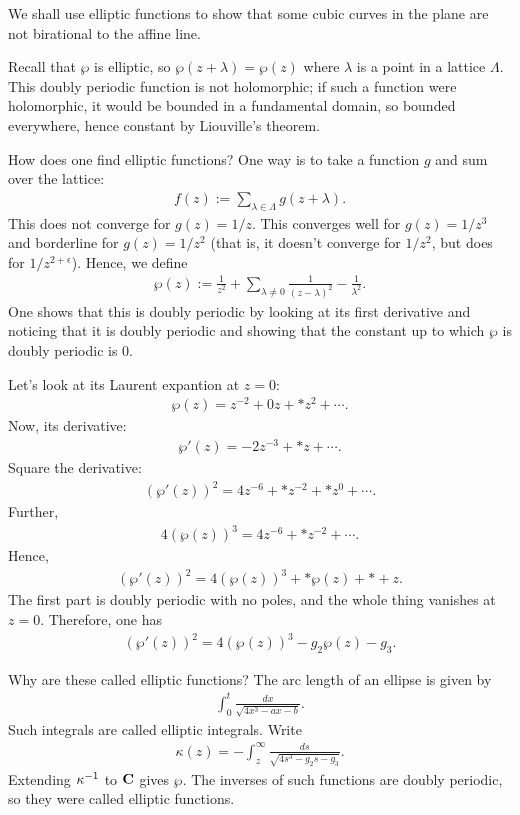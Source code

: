 \documentclass[11pt, oneside,margin=1in]{article}
\begin{document}
We shall use elliptic functions to show that some cubic curves in the plane are not birational to the affine line.

Recall that $\wp$ is elliptic, so $\wp(z+\lambda) = \wp(z)$ where $\lambda$ is a point in a lattice $\Lambda$. This doubly periodic function is not holomorphic; if such a function were holomorphic, it would be bounded in a fundamental domain, so bounded everywhere, hence constant by Liouville's theorem. 

How does one find elliptic functions? One way is to take a function $g$ and sum over the lattice:
\begin{align*}
	f(z) :=  \sum_{\lambda\in \Lambda}^{} g (z+\lambda).
\end{align*}
This does not converge for $g(z) = 1/z$. This converges well for $g(z) = 1/z^3$ and borderline for $g(z)=1/z^2$ (that is, it doesn't converge for $1/z^2$, but does for $1/z^{2+\epsilon}$). Hence, we define
 \begin{align*}
	\wp(z) :=  \frac{1}{z^2} + \sum_{\lambda\ne 0}^{} \frac{1}{(z-\lambda)^2} - \frac{1}{\lambda^2}.
\end{align*}
One shows that this is doubly periodic by looking at its first derivative and noticing that it is doubly periodic and showing that the constant up to which $\wp$ is doubly periodic is $0$.

Let's look at its Laurent expantion at $z=0$:
\begin{align*}
	\wp(z) = z^{-2} + 0 z + *z^2 + \cdots.
\end{align*}
Now, its derivative:
\begin{align*}
	\wp'(z) = -2z^{-3} + *z +\cdots.
\end{align*}
Square the derivative:
\begin{align*}
	(\wp'(z)) ^2 = 4z^{-6} + *z^{-2} + *z^0 + \cdots.
\end{align*}
Further,
\begin{align*}
	4(\wp(z)) ^3 = 4z^{-6} + *z^{-2} + \cdots.
\end{align*}
Hence,
\begin{align*}
	(\wp'(z)) ^2 = 4(\wp(z)) ^3 +  *\wp(z) + * + z.
\end{align*}
The first part is doubly periodic with no poles, and the whole thing vanishes at $z=0$. Therefore, one has
\begin{align*}
	(\wp'(z)) ^2 = 4(\wp(z)) ^3 - g_2 \wp(z) -  g_3.
\end{align*}

Why are these called elliptic functions? The arc length of an ellipse is given by 
\begin{align*}
	\int_{0}^{t} \frac{dx}{\sqrt{4x^3 - ax - b} }. 
\end{align*}
Such integrals are called elliptic integrals. Write
\begin{align*}
	\kappa(z) = -\int_{z}^{\infty} \frac{ds}{\sqrt{4s^3 -g_2s - g_3} }. 
\end{align*}
Extending $\kappa^{-1}$ to $\mathbf C$ gives $\wp$. The inverses of such functions are doubly periodic, so they were called elliptic functions.
\end{document}
